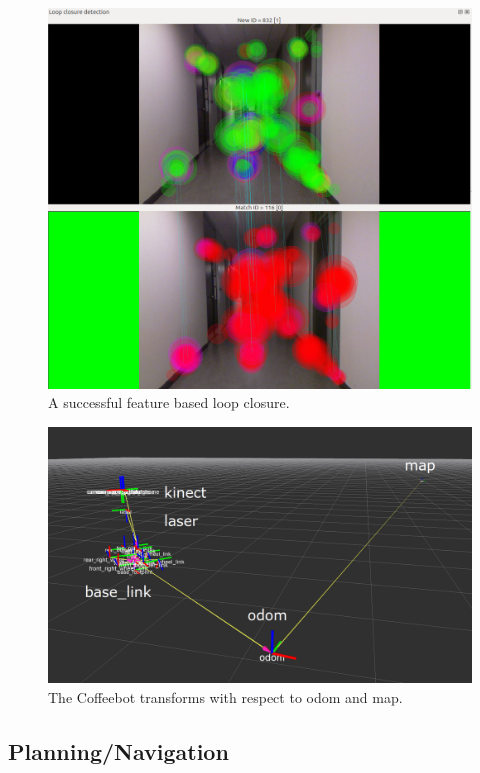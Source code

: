 \documentclass[letterpaper, 10 pt, conference]{ieeeconf}  %
\begin{document}
	\begin{figure}[!ht]
		\centering
		\includegraphics[width=1.0\columnwidth]{Figures/loop_closure}
		\caption{A successful feature based loop closure.}
		\label{localization}
	\end{figure}

	\begin{figure}[!ht]
		\centering
		\includegraphics[width=1.0\columnwidth]{Figures/Transforms}
		\caption{The Coffeebot transforms with respect to odom and map.}
		\label{transforms}
	\end{figure}

\subsection{Planning/Navigation}
\end{document}
